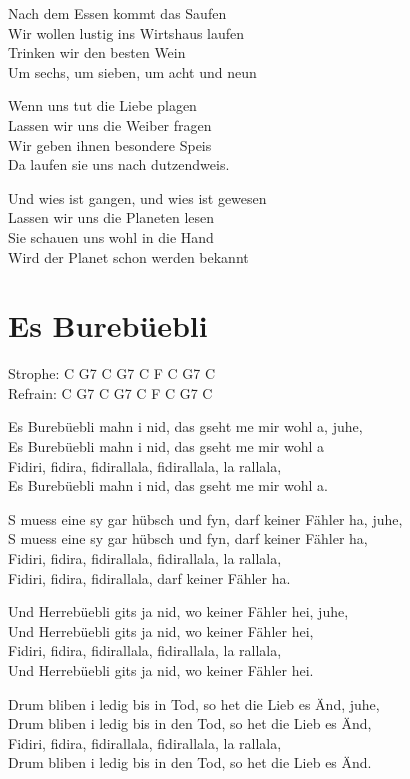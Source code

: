\documentclass[
  letterpaper,
  twoside=false]{scrbook}
\begin{document}
Nach dem Essen kommt das Saufen\\
Wir wollen lustig ins Wirtshaus laufen\\
Trinken wir den besten Wein\\
Um sechs, um sieben, um acht und neun

Wenn uns tut die Liebe plagen\\
Lassen wir uns die Weiber fragen\\
Wir geben ihnen besondere Speis\\
Da laufen sie uns nach dutzendweis.

Und wies ist gangen, und wies ist gewesen\\
Lassen wir uns die Planeten lesen\\
Sie schauen uns wohl in die Hand\\
Wird der Planet schon werden bekannt

\hypertarget{es-burebuxfcebli}{%
\chapter{Es Burebüebli}\label{es-burebuxfcebli}}

Strophe: C G7 C G7 C F C G7 C\\
Refrain: C G7 C G7 C F C G7 C

Es Burebüebli mahn i nid, das gseht me mir wohl a, juhe,\\
Es Burebüebli mahn i nid, das gseht me mir wohl a\\
Fidiri, fidira, fidirallala, fidirallala, la rallala,\\
Es Burebüebli mahn i nid, das gseht me mir wohl a.

S muess eine sy gar hübsch und fyn, darf keiner Fähler ha, juhe,\\
S muess eine sy gar hübsch und fyn, darf keiner Fähler ha,\\
Fidiri, fidira, fidirallala, fidirallala, la rallala,\\
Fidiri, fidira, fidirallala, darf keiner Fähler ha.

Und Herrebüebli git\textquotesingle s ja nid, wo keiner Fähler hei,
juhe,\\
Und Herrebüebli git\textquotesingle s ja nid, wo keiner Fähler hei,\\
Fidiri, fidira, fidirallala, fidirallala, la rallala,\\
Und Herrebüebli git\textquotesingle s ja nid, wo keiner Fähler hei.

Drum bliben i ledig bis in Tod, so het die Lieb es Änd, juhe,\\
Drum bliben i ledig bis in den Tod, so het die Lieb es Änd,\\
Fidiri, fidira, fidirallala, fidirallala, la rallala,\\
Drum bliben i ledig bis in den Tod, so het die Lieb es Änd.
\end{document}

